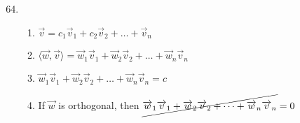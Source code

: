 \documentclass[12pt]{article}
\begin{document}
\begin{enumerate}
    \setcounter{enumi}{63}

  \item

    \begin{enumerate}

      \item $\overrightarrow{v}=c_1\overrightarrow{v}_1+c_2\overrightarrow{v}_2+\dots+\overrightarrow{v}_n$

      \item $\langle\overrightarrow{w},\overrightarrow{v}\rangle=\overrightarrow{w}_1\overrightarrow{v}_1+\overrightarrow{w}_2\overrightarrow{v}_2+\dots+\overrightarrow{w}_n\overrightarrow{v}_n$

      \item $\overrightarrow{w}_1\overrightarrow{v}_1+\overrightarrow{w}_2\overrightarrow{v}_2+\dots+\overrightarrow{w}_n\overrightarrow{v}_n=c$

      \item If $\overrightarrow{w}$ is orthogonal, then $\cancel{\overrightarrow{w}_1\overrightarrow{v}_1+\overrightarrow{w}_2\overrightarrow{v}_2+\dots+\overrightarrow{w}_n\overrightarrow{v}_n}=0$

    \end{enumerate}

\end{enumerate}
\end{document}
